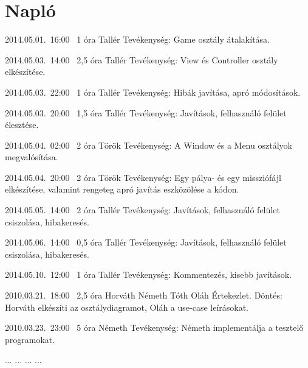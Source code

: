 %
\section{Napló}

\begin{naplo}

\bejegyzes
{2014.05.01.~16:00~}
{1 óra}
{Tallér}
{Tevékenység: Game osztály átalakítása.}

\bejegyzes
{2014.05.03.~14:00~}
{2,5 óra}
{Tallér}
{Tevékenység: View és Controller osztály elkészítése.}

\bejegyzes
{2014.05.03.~22:00~}
{1 óra}
{Tallér}
{Tevékenység: Hibák javítása, apró módosítások.}

\bejegyzes
{2014.05.03.~20:00~}
{1,5 óra}
{Tallér}
{Tevékenység: Javítások, felhasználó felület élesztése.}

\bejegyzes
{2014.05.04.~02:00~}
{2 óra}
{Török}
{Tevékenység: A Window és a Menu osztályok megvalósítása.}

\bejegyzes
{2014.05.04.~20:00~}
{2 óra}
{Török}
{Tevékenység: Egy pálya- és egy missziófájl elkészítése, valamint rengeteg apró javítás eszközölése a kódon.}

\bejegyzes
{2014.05.05.~14:00~}
{2 óra}
{Tallér}
{Tevékenység: Javítások, felhasználó felület csiszolása, hibakeresés.}

\bejegyzes
{2014.05.06.~14:00~}
{0,5 óra}
{Tallér}
{Tevékenység: Javítások, felhasználó felület csiszolása, hibakeresés.}

\bejegyzes
{2014.05.10.~12:00~}
{1 óra}
{Tallér}
{Tevékenység: Kommentezés, kisebb javítások.}

\bejegyzes
{2010.03.21.~18:00~} %
{2,5 óra} %
{Horváth\newline
Németh\newline
Tóth\newline
Oláh} %
{Értekezlet. Döntés: Horváth elkészíti az osztálydiagramot, Oláh a use-case leírásokat.} %

\bejegyzes
{2010.03.23.~23:00~}
{5 óra}
{Németh}
{Tevékenység: Németh implementálja a tesztelő programokat.}

\bejegyzes
{...}
{...}
{...}
{...}


\end{naplo}

